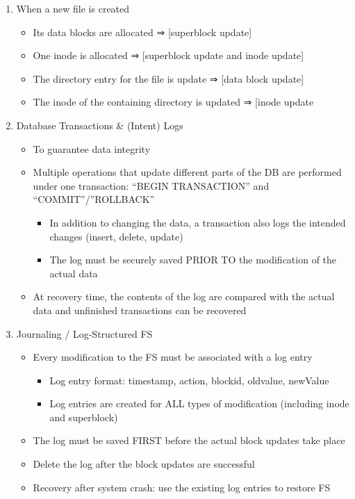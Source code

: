 \documentclass[11pt]{article}
\begin{document}
\begin{enumerate}
\item When a new file is created
	\begin{itemize}
  	\item Its data blocks are allocated ⇒ [superblock update]
  	\item One inode is allocated ⇒ [superblock update and inode update]
  	\item The directory entry for the file is update ⇒ [data block update]
  	\item The inode of the containing directory is updated ⇒ [inode update
  	\end{itemize}
  	
\item Database Transactions & (Intent) Logs
	\begin{itemize}
  	\item To guarantee data integrity
  	\item Multiple operations that update different parts of the DB are performed under one transaction: “BEGIN TRANSACTION” and “COMMIT”/”ROLLBACK”
  		\begin{itemize}
  		\item In addition to changing the data, a transaction also logs the intended changes (insert, delete, update)
  		\item The log must be securely saved PRIOR TO the modification of the actual data
  		\end{itemize}
  	\item At recovery time, the contents of the log are compared with the actual data and unfinished transactions can be recovered
  	\end{itemize}

\item Journaling / Log-Structured FS
	\begin{itemize}
  	\item Every modification to the FS must be associated with a log entry
  		\begin{itemize}
  		\item Log entry format: timestamp, action, blockid, oldvalue, newValue
  		\item Log entries are created for ALL types of modification (including inode and superblock)
  		\end{itemize}
  	\item The log must be saved FIRST before the actual block updates take place
  	\item Delete the log after the block updates are successful
  	\item Recovery after system crash: use the existing log entries to restore FS
  	\end{itemize}

\end{enumerate}
\end{document}
